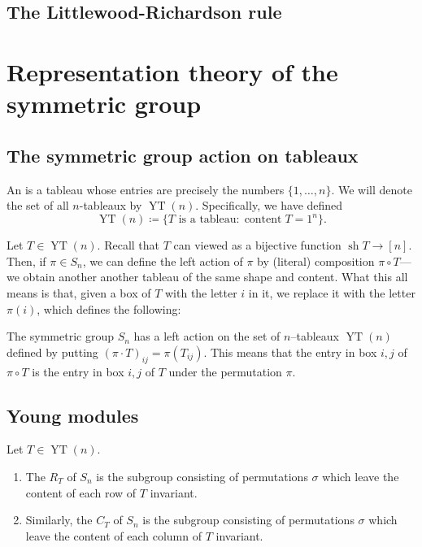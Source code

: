 \documentclass{article}
\DeclareMathOperator{\sh}{sh}
\DeclareMathOperator{\content}{content}
\DeclareMathOperator{\YT}{YT}
\begin{document}
\subsection{The Littlewood-Richardson rule}

\section{Representation theory of the symmetric group}

\subsection{The symmetric group action on tableaux}

\begin{definition}
    An  is a tableau whose entries are precisely the numbers $\{1,\ldots,n\}$.
    We will denote the set of all $n$-tableaux by $\YT(n)$.
    Specifically, we have defined
    \[
        \YT(n)
        \coloneq
        \{\text{$T$ is a tableau} : \content T = 1^n\}.
    \]
\end{definition}

Let $T \in \YT(n)$.
Recall that $T$ can viewed as a bijective function $\sh T \to [n]$.
Then, if $\pi \in S_n$, we can define the left action of $\pi$ by (literal) composition $\pi \circ T$--- we obtain another another tableau of the same shape and content.
What this all means is that, given a box of $T$ with the letter $i$ in it, we replace it with the letter $\pi(i)$, which defines the following:

\begin{definition}
    The symmetric group $S_n$ has a left action on the set of $n$--tableaux $\YT(n)$ defined by putting $(\pi \cdot T)_{ij} = \pi (T_{ij})$.
    This means that the entry in box $i,j$ of $\pi \circ T$ is the entry in box $i,j$ of $T$ under the permutation $\pi$.
\end{definition}

\subsection{Young modules}

\begin{definition}
    Let $T \in \YT(n)$.
    \begin{enumerate}[label=(\alph*)]
        \item 
    The  $R_T$ of $S_n$ is the subgroup consisting of permutations $\sigma$ which leave the content of each row of $T$ invariant.
        \item 
            Similarly, the  $C_T$ of $S_n$ is the subgroup consisting of permutations $\sigma$ which leave the content of each column of $T$ invariant.
    \end{enumerate}
\end{definition}
\end{document}
